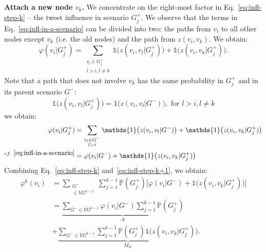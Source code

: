 \textbf{Attach a new node $v_k$.}
We concentrate on the right-most factor in Eq.~\eqref{eq:infl-step-k} -- the tweet influence in scenario $G^+_j$.
We observe that the terms in Eq.~\eqref{eq:infl-in-a-scenario} can be divided into two:
the paths from $v_i$ to all other nodes except $v_k$ (i.e. the old nodes) and the path from $z(v_i, v_k)$.
We obtain:
%
%
\begin{equation*}
	\varphi(v_i|G_j^+) = \sum_{\substack{v_l\in{G_j^+}\\l>i, l\neq k}} \mathds{1}\big(z(v_i,v_l|G_j^+)\big) + \mathds{1}\big(z(v_i,v_k|G_j^+)\big).
\end{equation*}
Note that a path that does not involve $v_k$ has the same probability in $G_j^+$ and in its parent scenario $G^-$:
\begin{equation*}
	\mathds{1}\big(z(v_i,v_l|G_j^+)\big) = \mathds{1}\big(z(v_i,v_l|G^-)\big), \text{ for } l > i, l \neq k
\end{equation*}
we obtain:
\begin{align}
				\varphi(v_i|G_j^+) 		&= \sum_{\substack{v_l\in{G^-}\\l>i}} \mathds{1}\big(z(v_i,v_l|G^-)\big) + \mathds{1}\big(z(v_i,v_k|G_j^+)\big) \nonumber \\
^{cf.~\eqref{eq:infl-in-a-scenario}}	&= \varphi(v_i | G^-) + \mathds{1}\big(z(v_i,v_k|G_j^+)\big) \label{eq:infl-step-k+1}
\end{align}
Combining Eq.~\eqref{eq:infl-step-k} and~\eqref{eq:infl-step-k+1}, we obtain:
\begin{align}
\varphi^k(v_i) &= \sum_{\substack{G^-\\\in VG^{k-1}}}\sum^{k-1}_{j=1} \mathds{P}(G_j^+) \bigg[ \varphi(v_i | G^-) + \mathds{1}\big(z(v_i,v_k|G_j^+)\big) \bigg] \nonumber \\
        &= \underbrace{\sum_{G^- \in {VG^{k-1}}} \varphi(v_i | G^-) \sum^{k-1}_{j=1}\mathds{P}(G_j^+) }_{A} \nonumber \\
        &+ \underbrace{\sum_{G^- \in {VG^{k-1}}}\sum^{k-1}_{j=1} \mathds{P}(G_j^+) \mathds{1}\big(z(v_i,v_k|G_j^+)\big) }_{M_{ik}}. \label{eq:two-parts}
\end{align}

